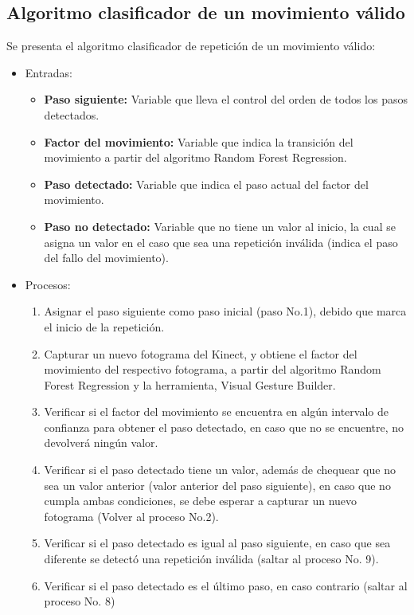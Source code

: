 \subsection{Algoritmo clasificador de un movimiento v\'alido}\label{dis:algoritmoDet}
Se presenta el algoritmo clasificador de repetici\'on de un movimiento v\'alido:
\begin{itemize}
\item Entradas:
\begin{itemize}
\item \textbf{Paso siguiente:} Variable que lleva el control del orden de todos los pasos detectados.
\item \textbf{Factor del movimiento:} Variable que indica la transici\'on del movimiento a partir del algoritmo Random Forest Regression.
\item \textbf{Paso detectado:} Variable que indica el paso actual del factor del movimiento.
\item \textbf{Paso no detectado:} Variable que no tiene un valor al inicio, la cual se asigna un valor en el caso que sea una repetici\'on inv\'alida (indica el paso del fallo del movimiento).
\end{itemize}
\item Procesos:
\begin{enumerate}[1.]
\item Asignar el paso siguiente como paso inicial (paso No.1), debido que marca el inicio de la repetici\'on. %
\item Capturar un nuevo fotograma del Kinect, y obtiene el factor del movimiento del respectivo fotograma, a partir del algoritmo Random Forest Regression y la herramienta, Visual Gesture Builder. %
\item Verificar si el factor del movimiento se encuentra en alg\'un intervalo de confianza para obtener el paso detectado, en caso que no se encuentre, no devolver\'a ning\'un valor.  %
\item Verificar si el paso detectado tiene un valor, adem\'as de chequear que no sea un valor anterior (valor anterior del paso siguiente), en caso que no cumpla ambas condiciones, se debe esperar a capturar un nuevo fotograma (Volver al proceso No.2). %
\item Verificar si el paso detectado es igual al paso siguiente, en caso que sea diferente se detect\'o una repetici\'on inv\'alida (saltar al proceso No. 9). %
\item Verificar si el paso detectado es el \'ultimo paso, en caso contrario (saltar al proceso No. 8) %

\end{enumerate}
\end{itemize}
